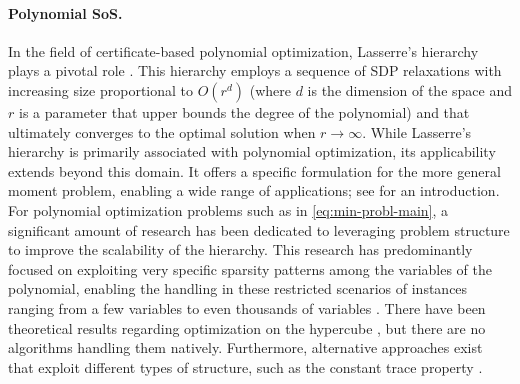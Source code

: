 \documentclass{article}
\begin{document}
\paragraph{Polynomial SoS.}
In the field of certificate-based polynomial optimization, Lasserre's hierarchy plays a pivotal role \cite{lasserreGlobalOptimizationPolynomials2001,lasserreMomentsPositivePolynomials2009}. This hierarchy employs a sequence of SDP relaxations with increasing size proportional to $O(r^d)$ (where $d$ is the dimension of the space and  $r$ is a parameter that upper bounds the degree of the polynomial) and that ultimately converges to the optimal solution when $r \to \infty$. While Lasserre's hierarchy is primarily associated with polynomial optimization, its applicability extends beyond this domain. It offers a specific formulation for the more general moment problem, enabling a wide range of applications; see \cite{henrionMomentSOSHierarchy2020} for an introduction. For polynomial optimization problems such as in \cref{eq:min-probl-main}, a significant amount of research has been dedicated to leveraging problem structure to improve the scalability of the hierarchy. This research has predominantly focused on exploiting very specific sparsity patterns among the variables of the polynomial, enabling the handling in these restricted scenarios of instances ranging from a few variables to even thousands of variables \cite{wakiSumsSquaresSemidefinite2006,wangTSSOSMomentSOSHierarchy2021,wangChordalTSSOSMomentSOSHierarchy2021}. There have been theoretical results regarding optimization on the hypercube \cite{bachExponentialConvergenceSumofsquares2023, 99ae17951e7d4143b7d654705a2ac0c2}, but there are no algorithms handling them natively. Furthermore, alternative approaches exist that exploit different types of structure, such as the constant trace property \cite{maiExploitingConstantTrace2022}.
\end{document}
